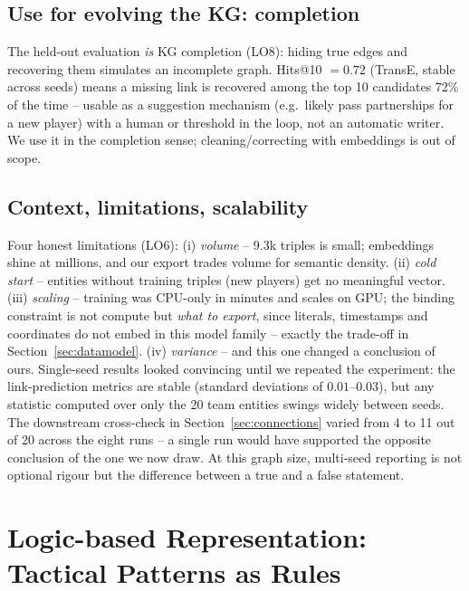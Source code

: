 \documentclass[11pt,a4paper]{article}
\begin{document}

\subsection{Use for evolving the KG: completion}

The held-out evaluation \emph{is} KG completion (LO8): hiding true edges and
recovering them simulates an incomplete graph. Hits@10 $= 0.72$ (TransE, stable
across seeds) means a missing link is recovered among the top 10 candidates 72\%
of the time -- usable
as a suggestion mechanism (e.g.\ likely pass partnerships for a new player) with
a human or threshold in the loop, not an automatic writer. We use it in the
completion sense; cleaning/correcting with embeddings is out of scope.

\subsection{Context, limitations, scalability}

Four honest limitations (LO6): (i) \emph{volume} -- 9.3k triples is small;
embeddings shine at millions, and our export trades volume for semantic density.
(ii) \emph{cold start} -- entities without training triples (new players) get no
meaningful vector. (iii) \emph{scaling} -- training was CPU-only in minutes and
scales on GPU; the binding constraint is not compute but \emph{what to export},
since literals, timestamps and coordinates do not embed in this model family --
exactly the trade-off in Section~\ref{sec:datamodel}. (iv) \emph{variance} --
and this one changed a conclusion of ours. Single-seed results looked
convincing until we repeated the experiment: the link-prediction metrics are
stable (standard deviations of $0.01$--$0.03$), but any statistic computed over
only the 20 team entities swings widely between seeds. The downstream
cross-check in Section~\ref{sec:connections} varied from 4 to 11 out of 20
across the eight runs -- a single run would have supported the opposite
conclusion of the one we now draw. At this graph size, multi-seed reporting is
not optional rigour but the difference between a true and a false statement.

\section{Logic-based Representation: Tactical Patterns as Rules}
\label{sec:logic}
\end{document}
